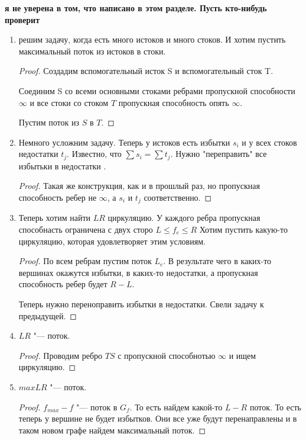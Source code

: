 \textbf{\color{red} я не уверена в том, что написано в этом разделе. Пусть кто-нибудь проверит}
\begin{enumerate}
\item решим задачу, когда есть много 
истоков и много стоков. И хотим пустить максимальный поток из
истоков в стоки. 

    \begin{proof}
    Создадим вспомогательный исток S и вспомогательный сток T.
    
    Соединим S со всеми основными стоками  ребрами пропускной
    способности $\infty$ и все стоки со стоком $T$ пропускная
    способность опять $\infty$.

    Пустим поток из $S$ в $T$. 
    \end{proof}
\item Немного усложним задачу. Теперь у истоков
есть избытки $s_i$ и у всех стоков недостатки $t_j$. 
Известно, что $\sum s_i = \sum t_j$. Нужно "переправить"
все избытьки в недостатки .
    \begin{proof}
        Такая же конструкция, как и в прошлый раз, 
        но пропускная способность ребер не $\infty$, 
        а $s_i$ и $t_j$ соответственно.
    \end{proof}
\item Теперь хотим найти $LR$ циркуляцию. У каждого ребра
пропускная способнасть ограничена с двух сторо $L \le f_e \le R$
Хотим пустить какую-то циркуляцию, которая удовлетворяет этим условиям.
    \begin{proof}
        По всем ребрам пустим поток $L_e$. В результате чего в
        каких-то вершинах окажутся избытки, в каких-то недостатки,
        а пропускная способность ребер будет $R-L$.

        Теперь нужно переноправить избытки в недостатки. Свели задачу к предыдущей. 
    \end{proof} 
\item $LR$ "--- поток. 
    \begin{proof}
        Проводим ребро $TS$ с пропускной способнотью $\infty$ и ищем циркуляцию.
    \end{proof}
\item $max LR$ "--- поток. 
    \begin{proof}
     $f_{max} - f$ "--- поток в $G_f$.
     То есть найдем какой-то $L-R$ поток. То есть теперь у вершине не будет избытков. Они все уже
     будут перенаправлены и в таком новом графе найдем максимальный поток. 
    \end{proof}
\end{enumerate} 
 
